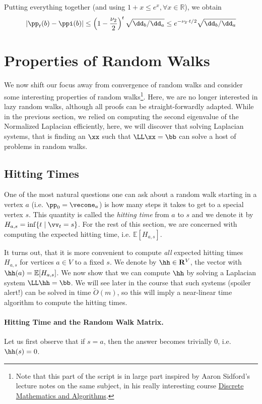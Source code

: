 Putting everything together (and using $1+x \leq e^x, \forall x \in \mathbb{R}$), we obtain 
\[  
    |\pp_t(b) - \ppi(b)| \leq \left(1-\frac{\nu_2}{2}\right)^t \sqrt{\dd_b/\dd_a} \leq e^{-\nu_2 \cdot t/2} \sqrt{\dd_b/\dd_a} 
\]

\section{Properties of Random Walks}

We now shift our focus away from convergence of random walks and consider some interesting properties of random walks\footnote{Note that this part of the script is in large part inspired by Aaron Sidford's lecture notes on the same subject, in his really interesting course
\href{https://web.stanford.edu/class/cme305/}{Discrete Mathematics and Algorithms}.}. Here, we are no longer interested in lazy random walks, although all proofs can be straight-forwardly adapted. While in the previous section, we relied on computing the second eigenvalue of the Normalized Laplacian efficiently, here, we will discover that solving Laplacian systems, that is finding an $\xx$ such that $\LL\xx = \bb$ can solve a host of problems in random walks.

\subsection{Hitting Times}

One of the most natural questions one can ask about a random walk starting in a vertex $a$ (i.e. $\pp_0 = \vecone_a$) is how many steps it takes to get to a special vertex $s$. This quantity is called the \emph{hitting time} from $a$ to $s$ and we denote it by $H_{a,s} = \inf \{ t \;|\; \vv_t = s \}$. For the rest of this section, we are concerned with computing the expected hitting time, i.e. $\mathbb{E}[H_{a,s}]$.

It turns out, that it is more convenient to compute \emph{all} expected hitting times $H_{a,s}$ for vertices $a \in V$ to a fixed $s$. We denote by $\hh \in \mathbf{R}^V$, the vector with $\hh(a) = \mathbb{E}[H_{a,s}]$. We now show that we can compute $\hh$ by solving a Laplacian system $\LL \hh = \bb$. We will see later in the course that such systems (spoiler alert!) can be solved in time $\tilde{O}(m)$, so this will imply a near-linear time algorithm to compute the hitting times.

\paragraph{Hitting Time and the Random Walk Matrix.} Let us first observe that if $s = a$, then the answer becomes trivially $0$, i.e. $\hh(s) = 0$. 

